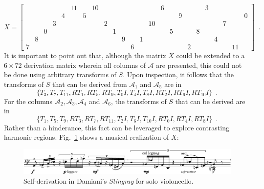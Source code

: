 \begin{example}
    \begin{equation}
        X = \left[
        \begin{array}{cccccccccccc|cccccccccccc}
            &&&&& 11 && 10 &&&&&&& 6 &&&&& 3 &&&& \\
            &&&& 4 && 5 &&&&&&&&&& 9 &&&&&&& 0 \\
            &&& 3 &&&&& 2 &&&&& 10 &&&&&&&& 7 && \\
            && 0 &&&&&&& 1 &&&&&& 5 &&& 8 &&&&& \\
            & 8 &&&&&&&&& 9 && 1 &&&&&&&& 4 &&& \\
            7 &&&&&&&&&&& 6 &&&&&& 2 &&&&& 11 &
        \end{array}
        \right] \enspace.
    \end{equation}
    It is important to point out that, although the matrix $X$ could be extended to a $6 \times 72$ derivation matrix wherein all columns of $\mathcal{A}$ are presented, this could not be done using arbitrary transforms of $S$. Upon inspection, it follows that the transforms of $S$ that can be derived from $\mathcal{A}_1$ and $\mathcal{A}_5$ are in
    \begin{equation}
        \{ T_3, T_7, T_{11}, RT_1, RT_5, RT_9, T_0I, T_4I, T_8I, RT_2I, RT_6I, RT_{10}I \} \enspace.
    \end{equation}
    For the columns $\mathcal{A}_2, \mathcal{A}_3, \mathcal{A}_4$ and $\mathcal{A}_6$, the transforms of $S$ that can be derived are in
    \begin{equation}
        \{ T_1, T_5, T_9, RT_3, RT_7, RT_{11}, T_2I, T_6I, T_{10}I, RT_0I, RT_4I, RT_8I \} \enspace.
    \end{equation}
    Rather than a hinderance, this fact can be leveraged to explore contrasting harmonic regions. Fig.~\ref{fig:stingray} shows a musical realization of $X$:
    \begin{figure}[htbp]
        \centering
        \includegraphics[width=6.5in]{figures/stingray-example.pdf}
        \caption[Self-derivation in Damiani's \emph{Stingray}.]{Self-derivation in Damiani's \emph{Stingray} for solo violoncello.}
        \label{fig:stingray}
    \end{figure}
\end{example}

